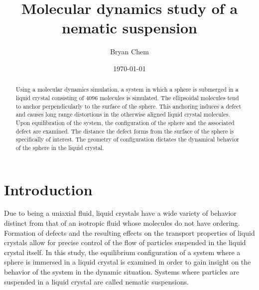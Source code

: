 \documentclass[preprint, aps]{revtex4-1}
\begin{document}

\title{Molecular dynamics study of a nematic suspension}
\author{Bryan Chem}
\date{\today}

\begin{abstract}
Using a molecular dynamics simulation, a system in which a sphere is submerged 
in a liquid crystal consisting of 4096 molecules is simulated. The ellipsoidal 
molecules tend to anchor perpendicularly to the surface of the sphere. This
anchoring induces a defect and causes long range distortions in the 
otherwise aligned liquid crystal molecules. Upon equilibration of the system, 
the configuration of the sphere and the associated defect are examined. The 
distance the defect forms from the surface of the sphere is specifically of 
interest. The geometry of configuration dictates the dynamical behavior of the 
sphere in the liquid crystal.

\end{abstract}

\maketitle

\tableofcontents

\newpage

\section*{Introduction}
Due to being a uniaxial fluid, liquid crystals have a wide variety of 
behavior distinct from that of an isotropic fluid whose molecules do not have
ordering. Formation of defects and the resulting effects on the transport 
properties of liquid crystals allow for precise control of the flow of particles
suspended in the liquid crystal itself. In this study, the equilibrium
configuration of a system where a sphere is immersed in a liquid crystal is
examined in order to gain insight on the behavior of the system in the dynamic
situation. Systems where particles are suspended in a liquid crystal are called
nematic suspensions. 
\end{document}
